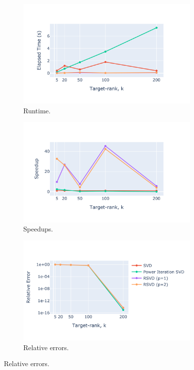 \documentclass[11pt,a4paper]{article}
\begin{document}
\begin{figure}[htbp]
    \centering
    \begin{subfigure}[b]{0.31\textwidth}
        \includegraphics[width=\textwidth, trim={100 100 100 100}, clip]{Images/svd_time.pdf}
        \caption{Runtime.}
        \label{fig:runtime}
    \end{subfigure}
    \hfill
    \begin{subfigure}[b]{0.31\textwidth}
        \includegraphics[width=\textwidth, trim={100 100 100 100}, clip]{Images/svd_speedup.pdf}
        \caption{Speedups.}
        \label{fig:speedups}
    \end{subfigure}
    \hfill
    \begin{subfigure}[b]{0.31\textwidth}
        \includegraphics[width=\textwidth, trim={100 100 100 100}, clip]{Images/svd_error.pdf}
        \caption{Relative errors.}
        \label{fig:errors}
    \end{subfigure}


\end{figure}
\end{document}
